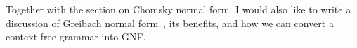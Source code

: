 
\phantom{.} \par

\begin{construction}
Together with the section on Chomsky normal form, I would also like to write a discussion of Greibach normal form~\citeyearpar{Greibach1965NewNormalFormTheorem}, its benefits, and how we can convert a context-free grammar into GNF.
\end{construction}

